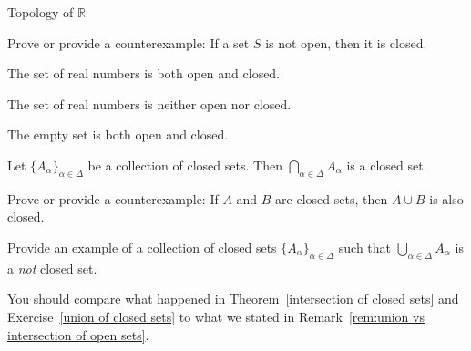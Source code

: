 \begin{section}{Topology of $\mathbb{R}$}
\begin{problem}
Prove or provide a counterexample: If a set $S$ is not open, then it is closed.
\end{problem}

\begin{theorem}
The set of real numbers is both open and closed.
\end{theorem}

\begin{theorem}
The set of real numbers is neither open nor closed.
\end{theorem}

\begin{theorem}
The empty set is both open and closed.
\end{theorem}

\begin{theorem}\label{intersection of closed sets}
Let $\{A_{\alpha}\}_{\alpha\in\Delta}$ be a collection of closed sets.  Then $\bigcap_{\alpha\in \Delta} A_{\alpha}$ is a closed set.
\end{theorem}

\begin{problem}
Prove or provide a counterexample: If $A$ and $B$ are closed sets, then $A\cup B$ is also closed.
\end{problem}

\begin{exercise}\label{union of closed sets}
Provide an example of a collection of closed sets $\{A_{\alpha}\}_{\alpha\in\Delta}$ such that $\bigcup_{\alpha\in \Delta} A_{\alpha}$ is a \emph{not} closed set.
\end{exercise}

\begin{remark}
You should compare what happened in Theorem~\ref{intersection of closed sets} and Exercise~\ref{union of closed sets} to what we stated in Remark~\ref{rem:union vs intersection of open sets}.
\end{remark}

\end{section}